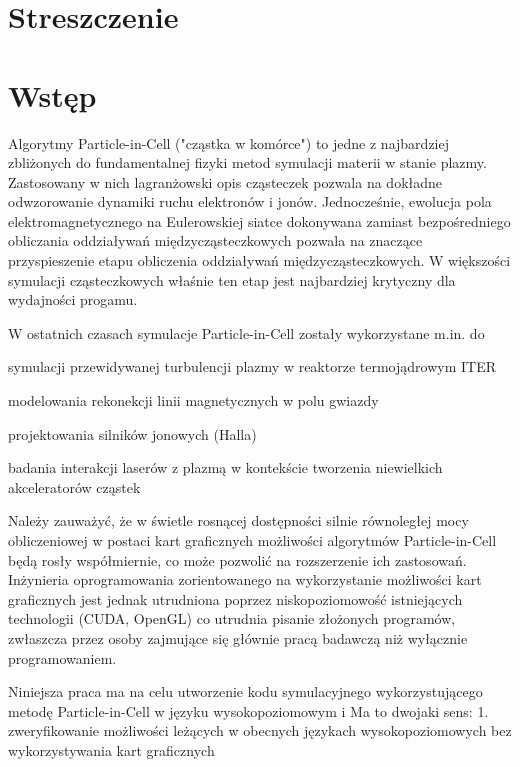 \section{Streszczenie} %
\section{Wstęp} %
Algorytmy Particle-in-Cell ("cząstka w komórce") to jedne z najbardziej zbliżonych do fundamentalnej fizyki
metod symulacji materii w stanie plazmy. Zastosowany w nich lagranżowski opis cząsteczek pozwala na dokładne
odwzorowanie dynamiki ruchu elektronów i jonów. Jednocześnie, ewolucja pola elektromagnetycznego na Eulerowskiej
siatce dokonywana zamiast bezpośredniego obliczania oddziaływań międzycząsteczkowych pozwala na znaczące
przyspieszenie etapu obliczenia oddziaływań międzycząsteczkowych. W większości symulacji cząsteczkowych właśnie
ten etap jest najbardziej krytyczny dla wydajności progamu.

W ostatnich czasach symulacje Particle-in-Cell zostały wykorzystane m.in. do
\item symulacji przewidywanej turbulencji plazmy w reaktorze termojądrowym ITER %
\item modelowania rekonekcji linii magnetycznych w polu gwiazdy %
\item projektowania silników jonowych (Halla) %
\item badania interakcji laserów z plazmą w kontekście tworzenia niewielkich akceleratorów cząstek %

Należy zauważyć, że w świetle rosnącej dostępności silnie równoległej mocy obliczeniowej w postaci kart graficznych %
możliwości algorytmów Particle-in-Cell będą rosły współmiernie, co może pozwolić na rozszerzenie ich zastosowań.
Inżynieria oprogramowania zorientowanego na wykorzystanie możliwości kart graficznych jest jednak utrudniona poprzez
niskopoziomowość %
istniejących technologii (CUDA, OpenGL) %
co utrudnia pisanie złożonych programów, zwłaszcza przez osoby zajmujące się głównie pracą badawczą
niż wyłącznie programowaniem. %

Niniejsza praca ma na celu utworzenie kodu symulacyjnego wykorzystującego metodę Particle-in-Cell w języku
wysokopoziomowym i %
Ma to dwojaki sens:
1. zweryfikowanie możliwości leżących w obecnych językach wysokopoziomowych bez wykorzystywania kart graficznych
